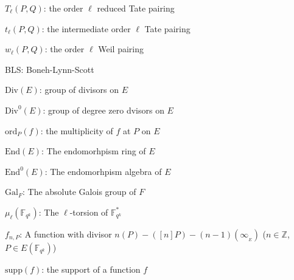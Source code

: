 \documentclass[11pt, lettersize, notitlepage, leqno, footskip=0.6cm]{article}
\newcommand{\bz}{\mathbb Z}
\newcommand{\bFqk}{\mathbb{F}_{q^k}}
\newcommand{\absf}{\mathrm{Gal}_F}
\newcommand{\mr}{\mathrm}
\newcommand{\noin}{\noindent}
\newcommand{\End}{\mr{End}}
\numberwithin{equation}{section}
\begin{document}
\noin $T_{\ell}(P,Q)$: the order $\ell$ reduced Tate pairing \vspace{2mm}

\noin $t_{\ell}(P,Q)$: the intermediate order $\ell$ Tate pairing \vspace{2mm}

\noin $w_{\ell}(P,Q)$: the order $\ell$ Weil pairing  \vspace{2mm}

\noin BLS: Boneh-Lynn-Scott \vspace{2mm}

\noin $\mr{Div}(E)$: group of divisors on $E$ \vspace{2mm}

\noin $\mr{Div}^0(E)$: group of degree zero dvisors on $E$ \vspace{2mm}

\noin $\mr{ord}_P(f)$: the multiplicity of $f$ at $P$ on $E$ \vspace{2mm}

\noin $\End(E)$: The endomorhpism ring of $E$  \vspace{2mm}

\noin $\End^0(E)$: The endomorhpism algebra of $E$ \vspace{2mm}

\noin $\absf$: The absolute Galois group of $F$ \vspace{2mm}

\noin $\mu_{\ell}(\bFqk)$: The $\ell$-torsion of $\bFqk^*$

\noin $f_{n,P}$: A function with divisor $n(P)-([n]P)- (n-1)(\infty_{_E})$ \hspace{2mm} ($n\in \bz$, $P\in E(\bFqk)$)

\noin $\mr{supp}(f)$: the support of a function $f$
\end{document}

